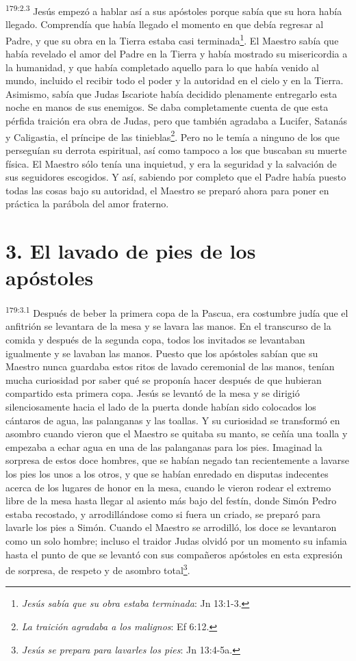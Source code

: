 \par 
\textsuperscript{179:2.3} Jesús empezó a hablar así a sus apóstoles porque sabía que su hora había llegado. Comprendía que había llegado el momento en que debía regresar al Padre, y que su obra en la Tierra estaba casi terminada\footnote{\textit{Jesús sabía que su obra estaba terminada}: Jn 13:1-3.}. El Maestro sabía que había revelado el amor del Padre en la Tierra y había mostrado su misericordia a la humanidad, y que había completado aquello para lo que había venido al mundo, incluido el recibir todo el poder y la autoridad en el cielo y en la Tierra. Asimismo, sabía que Judas Iscariote había decidido plenamente entregarlo esta noche en manos de sus enemigos. Se daba completamente cuenta de que esta pérfida traición era obra de Judas, pero que también agradaba a Lucifer, Satanás y Caligastia, el príncipe de las tinieblas\footnote{\textit{La traición agradaba a los malignos}: Ef 6:12.}. Pero no le temía a ninguno de los que perseguían su derrota espiritual, así como tampoco a los que buscaban su muerte física. El Maestro sólo tenía una inquietud, y era la seguridad y la salvación de sus seguidores escogidos. Y así, sabiendo por completo que el Padre había puesto todas las cosas bajo su autoridad, el Maestro se preparó ahora para poner en práctica la parábola del amor fraterno.

\section*{3. El lavado de pies de los apóstoles}
\par 
\textsuperscript{179:3.1} Después de beber la primera copa de la Pascua, era costumbre judía que el anfitrión se levantara de la mesa y se lavara las manos. En el transcurso de la comida y después de la segunda copa, todos los invitados se levantaban igualmente y se lavaban las manos. Puesto que los apóstoles sabían que su Maestro nunca guardaba estos ritos de lavado ceremonial de las manos, tenían mucha curiosidad por saber qué se proponía hacer después de que hubieran compartido esta primera copa. Jesús se levantó de la mesa y se dirigió silenciosamente hacia el lado de la puerta donde habían sido colocados los cántaros de agua, las palanganas y las toallas. Y su curiosidad se transformó en asombro cuando vieron que el Maestro se quitaba su manto, se ceñía una toalla y empezaba a echar agua en una de las palanganas para los pies. Imaginad la sorpresa de estos doce hombres, que se habían negado tan recientemente a lavarse los pies los unos a los otros, y que se habían enredado en disputas indecentes acerca de los lugares de honor en la mesa, cuando le vieron rodear el extremo libre de la mesa hasta llegar al asiento más bajo del festín, donde Simón Pedro estaba recostado, y arrodillándose como si fuera un criado, se preparó para lavarle los pies a Simón. Cuando el Maestro se arrodilló, los doce se levantaron como un solo hombre; incluso el traidor Judas olvidó por un momento su infamia hasta el punto de que se levantó con sus compañeros apóstoles en esta expresión de sorpresa, de respeto y de asombro total\footnote{\textit{Jesús se prepara para lavarles los pies}: Jn 13:4-5a.}.

